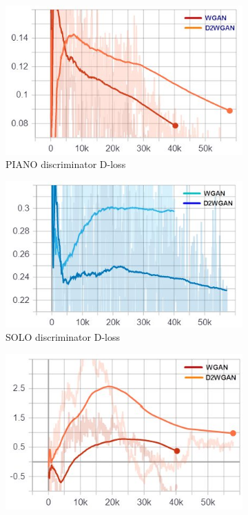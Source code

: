\documentclass{article} %
\begin{document}
\begin{figure}[h!]
  \centering
  \begin{subfigure}[b]{0.45\linewidth}
    \centering
    \includegraphics[width=\linewidth]{images/extendvsbasic52/vs_piano_neg_loss.jpg}
    \caption{PIANO discriminator D-loss}
  \end{subfigure}
  \begin{subfigure}[b]{0.45\linewidth}
    \centering
    \includegraphics[width=\linewidth]{images/extendvsbasic52/vs_solo_neg_loss.jpg}
    \caption{SOLO discriminator D-loss}
  \end{subfigure}
  \begin{subfigure}[b]{0.45\linewidth}
    \centering
    \includegraphics[width=\linewidth]{images/extendvsbasic52/vs_piano_gen_loss.jpg}

\end{subfigure}
\end{figure}
\end{document}

